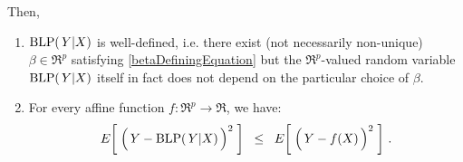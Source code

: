 \begin{theorem}
Then, 
\begin{enumerate}
\item
	$\textnormal{BLP}(\,Y\vert X)$ is well-defined, i.e. there exist (not necessarily non-unique)
	$\beta \in \Re^{p}$ satisfying \eqref{betaDefiningEquation} but
	the $\Re^{p}$-valued random variable $\textnormal{BLP}(\,Y\vert X)$ itself
	in fact does not depend on the particular choice of $\beta$.
\item
	For every affine function $f:\Re^{p}\longrightarrow\Re$, we have:
	\begin{equation*}
	E\!\left[\;\left(\,Y \overset{{\color{white}.}}{-} \blp(\,Y\vert X)\,\right)^{2}\;\right]
	\;\;\leq\;\;
	E\!\left[\;\left(\,Y \overset{{\color{white}.}}{-} f(X)\,\right)^{2}\;\right]\,.
	\end{equation*}
\end{enumerate}
\end{theorem}
\proof

